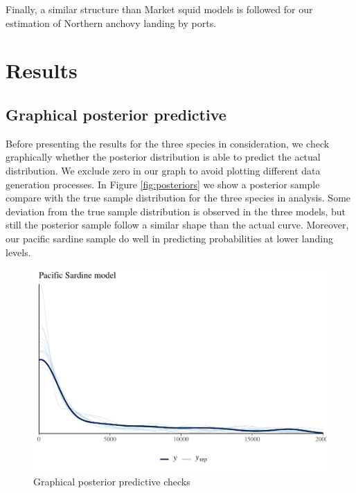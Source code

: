 Finally, a similar structure than Market squid models is followed for
our estimation of Northern anchovy landing by ports.

\hypertarget{results}{%
\section{Results}\label{results}}

\hypertarget{graphical-posterior-predictive}{%
\subsection{Graphical posterior
predictive}\label{graphical-posterior-predictive}}

Before presenting the results for the three species in consideration, we
check graphically whether the posterior distribution is able to predict
the actual distribution. We exclude zero in our graph to avoid plotting
different data generation processes. In Figure \ref{fig:posteriors} we
show a posterior sample compare with the true sample distribution for
the three species in analysis. Some deviation from the true sample
distribution is observed in the three models, but still the posterior
sample follow a similar shape than the actual curve. Moreover, our
pacific sardine sample do well in predicting probabilities at lower
landing levels.

\begin{Schunk}
\begin{figure}
\includegraphics{econ_landings_paper_files/figure-latex/y_rep-1} \caption{Graphical posterior predictive checks\label{fig:posteriors}}\label{fig:y_rep}
\end{figure}
\end{Schunk}

